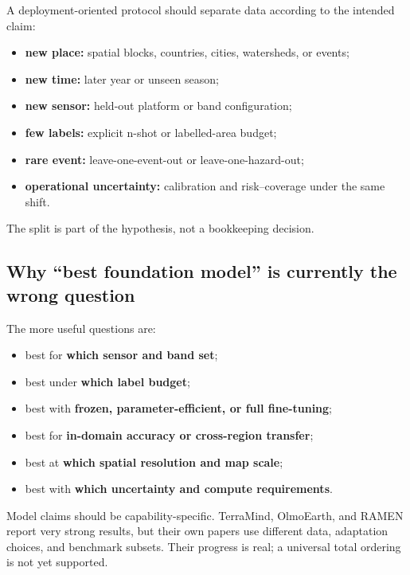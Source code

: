 \documentclass[
  a4paper,
  11pt]{article}
\providecommand{\tightlist}{%
  \setlength{\itemsep}{0pt}\setlength{\parskip}{0pt}}
\begin{document}
A deployment-oriented protocol should separate data according to the
intended claim:

\begin{itemize}
\tightlist
\item
  \textbf{new place:} spatial blocks, countries, cities, watersheds, or
  events;
\item
  \textbf{new time:} later year or unseen season;
\item
  \textbf{new sensor:} held-out platform or band configuration;
\item
  \textbf{few labels:} explicit n-shot or labelled-area budget;
\item
  \textbf{rare event:} leave-one-event-out or leave-one-hazard-out;
\item
  \textbf{operational uncertainty:} calibration and risk--coverage under
  the same shift.
\end{itemize}

The split is part of the hypothesis, not a bookkeeping decision.

\hypertarget{why-best-foundation-model-is-currently-the-wrong-question}{%
\subsection{Why ``best foundation model'' is currently the wrong
question}\label{why-best-foundation-model-is-currently-the-wrong-question}}

The more useful questions are:

\begin{itemize}
\tightlist
\item
  best for \textbf{which sensor and band set};
\item
  best under \textbf{which label budget};
\item
  best with \textbf{frozen, parameter-efficient, or full fine-tuning};
\item
  best for \textbf{in-domain accuracy or cross-region transfer};
\item
  best at \textbf{which spatial resolution and map scale};
\item
  best with \textbf{which uncertainty and compute requirements}.
\end{itemize}

Model claims should be capability-specific. TerraMind, OlmoEarth, and
RAMEN report very strong results, but their own papers use different
data, adaptation choices, and benchmark subsets. Their progress is real;
a universal total ordering is not yet supported.
\end{document}
